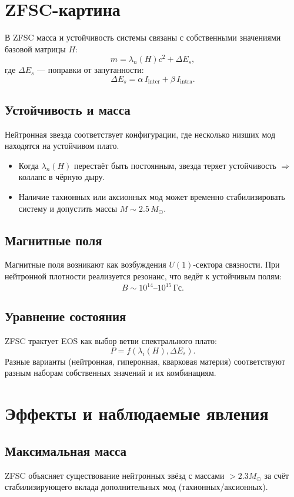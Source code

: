 \documentclass[a4paper,12pt]{article}
\begin{document}
\section*{ZFSC-картина}
В ZFSC масса и устойчивость системы связаны с собственными значениями базовой матрицы $H$:
\[
m = \lambda_n(H)c^2 + \Delta E_s,
\]
где $\Delta E_s$ --- поправки от запутанности:
\[
\Delta E_s = \alpha\,I_{\text{inter}} + \beta\,I_{\text{intra}}.
\]

\subsection*{Устойчивость и масса}
Нейтронная звезда соответствует конфигурации, где несколько низших мод находятся на устойчивом плато.  
\begin{itemize}
  \item Когда $\lambda_n(H)$ перестаёт быть постоянным, звезда теряет устойчивость $\Rightarrow$ коллапс в чёрную дыру.
  \item Наличие тахионных или аксионных мод может временно стабилизировать систему и допустить массы $M \sim 2.5\,M_\odot$.
\end{itemize}

\subsection*{Магнитные поля}
Магнитные поля возникают как возбуждения $U(1)$-сектора связности. При нейтронной плотности реализуется резонанс, что ведёт к устойчивым полям:
\[
B \sim 10^{14}\text{--}10^{15}\,\text{Гс}.
\]

\subsection*{Уравнение состояния}
ZFSC трактует EOS как выбор ветви спектрального плато:
\[
P = f(\lambda_i(H), \Delta E_s).
\]
Разные варианты (нейтронная, гиперонная, кварковая материя) соответствуют разным наборам собственных значений и их комбинациям.

\section*{Эффекты и наблюдаемые явления}

\subsection*{Максимальная масса}
ZFSC объясняет существование нейтронных звёзд с массами $>2.3 M_\odot$ за счёт стабилизирующего вклада дополнительных мод (тахионных/аксионных).  
\end{document}
